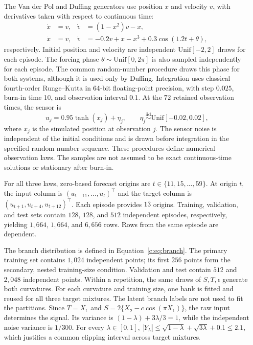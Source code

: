 The Van der Pol and Duffing generators use position $x$ and velocity $v$,
with derivatives taken with respect to continuous time:
\begin{align*}
 \dot x&=v,& \dot v&=(1-x^2)v-x,\\
 \dot x&=v,& \dot v&=-0.2v+x-x^3+0.3\cos(1.2t+\theta),
\end{align*}
respectively. Initial position and velocity are independent
$\mathrm{Unif}[-2,2]$ draws for each episode. The forcing phase
$\theta\sim\mathrm{Unif}[0,2\pi]$ is also sampled independently for each
episode. The common random-number procedure draws this phase for both
systems, although it is used only by Duffing. Integration uses classical
fourth-order Runge--Kutta in 64-bit floating-point precision, with step
$0.025$, burn-in time $10$, and observation interval $0.1$.
At the $72$ retained observation times, the sensor is
\[
 u_j=0.95\tanh(x_j)+\eta_j,\qquad
 \eta_j\stackrel{\mathrm{iid}}\sim\mathrm{Unif}[-0.02,0.02],
\]
where $x_j$ is the simulated position at observation $j$. The sensor
noise is independent of the initial conditions and is drawn before
integration in the specified random-number sequence. These procedures
define numerical observation laws. The samples are not assumed to be
exact continuous-time solutions or stationary after burn-in.

For all three laws, zero-based forecast origins are
$t\in\{11,15,\ldots,59\}$. At origin $t$, the input column is
$(u_{t-11},\ldots,u_t)^\top$ and the target column is
$(u_{t+1},u_{t+4},u_{t+12})^\top$. Each episode provides $13$ origins.
Training, validation, and test sets contain $128$, $128$, and $512$
independent episodes, respectively, yielding $1{,}664$, $1{,}664$, and
$6{,}656$ rows. Rows from the same episode are dependent.

The branch distribution is defined in Equation~\eqref{c:eq:branch}.
The primary training set contains $1{,}024$ independent points; its
first $256$ points form the secondary, nested training-size condition.
Validation and test contain $512$ and $2{,}048$ independent points.
Within a repetition, the same draws of $S,T,\epsilon$ generate both
curvatures. For each curvature and training size, one bank is fitted
and reused for all three target mixtures. The latent branch labels
are not used to fit the partitions. Since $T=X_1$ and
$S=2\{X_2-c\cos(\pi X_1)\}$, the raw input determines the signal.
Its variance is $(1-\lambda)+3\lambda/3=1$, while the independent
noise variance is $1/300$. For every $\lambda\in[0,1]$,
$|Y_\lambda|\leq\sqrt{1-\lambda}+\sqrt{3\lambda}+0.1\leq2.1$,
which justifies a common clipping interval across target mixtures.

